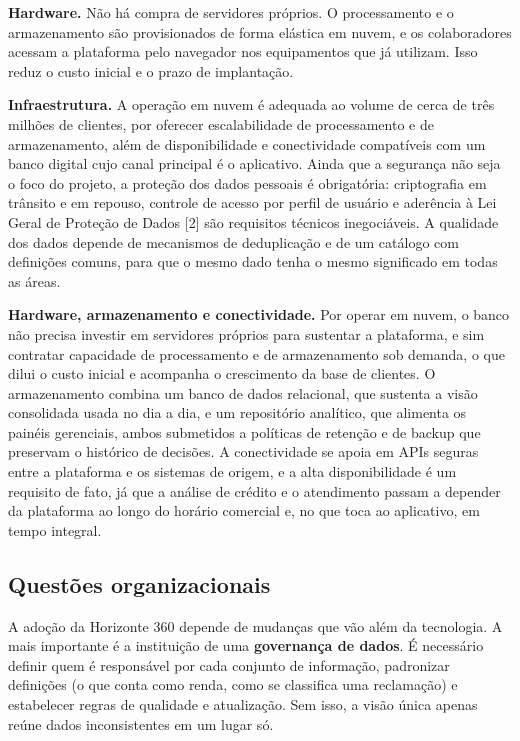 \documentclass[12pt,a4paper]{article}
\begin{document}
\textbf{Hardware.} N\~ao h\'a compra de servidores pr\'oprios. O processamento e o armazenamento s\~ao provisionados de forma el\'astica em nuvem, e os colaboradores acessam a plataforma pelo navegador nos equipamentos que j\'a utilizam. Isso reduz o custo inicial e o prazo de implanta\c{c}\~ao.

\textbf{Infraestrutura.} A opera\c{c}\~ao em nuvem \'e adequada ao volume de cerca de tr\^es milh\~oes de clientes, por oferecer escalabilidade de processamento e de armazenamento, al\'em de disponibilidade e conectividade compat\'iveis com um banco digital cujo canal principal \'e o aplicativo. Ainda que a seguran\c{c}a n\~ao seja o foco do projeto, a prote\c{c}\~ao dos dados pessoais \'e obrigat\'oria: criptografia em tr\^ansito e em repouso, controle de acesso por perfil de usu\'ario e ader\^encia \`a Lei Geral de Prote\c{c}\~ao de Dados [2] s\~ao requisitos t\'ecnicos inegoci\'aveis. A qualidade dos dados depende de mecanismos de deduplica\c{c}\~ao e de um cat\'alogo com defini\c{c}\~oes comuns, para que o mesmo dado tenha o mesmo significado em todas as \'areas.

\textbf{Hardware, armazenamento e conectividade.} Por operar em nuvem, o banco n\~ao precisa investir em servidores pr\'oprios para sustentar a plataforma, e sim contratar capacidade de processamento e de armazenamento sob demanda, o que dilui o custo inicial e acompanha o crescimento da base de clientes. O armazenamento combina um banco de dados relacional, que sustenta a vis\~ao consolidada usada no dia a dia, e um reposit\'orio anal\'itico, que alimenta os pain\'eis gerenciais, ambos submetidos a pol\'iticas de reten\c{c}\~ao e de backup que preservam o hist\'orico de decis\~oes. A conectividade se apoia em APIs seguras entre a plataforma e os sistemas de origem, e a alta disponibilidade \'e um requisito de fato, j\'a que a an\'alise de cr\'edito e o atendimento passam a depender da plataforma ao longo do hor\'ario comercial e, no que toca ao aplicativo, em tempo integral.

\subsection{Quest\~oes organizacionais}

A ado\c{c}\~ao da Horizonte 360 depende de mudan\c{c}as que v\~ao al\'em da tecnologia. A mais importante \'e a institui\c{c}\~ao de uma \textbf{governan\c{c}a de dados}. \'E necess\'ario definir quem \'e respons\'avel por cada conjunto de informa\c{c}\~ao, padronizar defini\c{c}\~oes (o que conta como renda, como se classifica uma reclama\c{c}\~ao) e estabelecer regras de qualidade e atualiza\c{c}\~ao. Sem isso, a vis\~ao \'unica apenas re\'une dados inconsistentes em um lugar s\'o.
\end{document}
